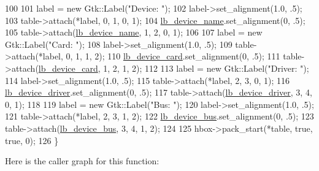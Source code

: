 \begin{DoxyCode}
100 
101         label = \textcolor{keyword}{new} Gtk::Label(\textcolor{stringliteral}{"Device: "});
102         label->set\_alignment(1.0, .5);
103         table->attach(*label, 0, 1, 0, 1);
104         \hyperlink{class_v_s_s_s___g_u_i_1_1_v4_l_interface_a0001884d9b8cfde31da71445c1604c8a}{lb\_device\_name}.set\_alignment(0, .5);
105         table->attach(\hyperlink{class_v_s_s_s___g_u_i_1_1_v4_l_interface_a0001884d9b8cfde31da71445c1604c8a}{lb\_device\_name}, 1, 2, 0, 1);
106 
107         label = \textcolor{keyword}{new} Gtk::Label(\textcolor{stringliteral}{"Card: "});
108         label->set\_alignment(1.0, .5);
109         table->attach(*label, 0, 1, 1, 2);
110         \hyperlink{class_v_s_s_s___g_u_i_1_1_v4_l_interface_add0fb393e547f0ccaa23d6b29025efe4}{lb\_device\_card}.set\_alignment(0, .5);
111         table->attach(\hyperlink{class_v_s_s_s___g_u_i_1_1_v4_l_interface_add0fb393e547f0ccaa23d6b29025efe4}{lb\_device\_card}, 1, 2, 1, 2);
112 
113         label = \textcolor{keyword}{new} Gtk::Label(\textcolor{stringliteral}{"Driver: "});
114         label->set\_alignment(1.0, .5);
115         table->attach(*label, 2, 3, 0, 1);
116         \hyperlink{class_v_s_s_s___g_u_i_1_1_v4_l_interface_a7fe7bf3327c1f25e1c3b44f53e5c5a8f}{lb\_device\_driver}.set\_alignment(0, .5);
117         table->attach(\hyperlink{class_v_s_s_s___g_u_i_1_1_v4_l_interface_a7fe7bf3327c1f25e1c3b44f53e5c5a8f}{lb\_device\_driver}, 3, 4, 0, 1);
118 
119         label = \textcolor{keyword}{new} Gtk::Label(\textcolor{stringliteral}{"Bus: "});
120         label->set\_alignment(1.0, .5);
121         table->attach(*label, 2, 3, 1, 2);
122         \hyperlink{class_v_s_s_s___g_u_i_1_1_v4_l_interface_a14d315a5613f2a10e2534c9090ca74c0}{lb\_device\_bus}.set\_alignment(0, .5);
123         table->attach(\hyperlink{class_v_s_s_s___g_u_i_1_1_v4_l_interface_a14d315a5613f2a10e2534c9090ca74c0}{lb\_device\_bus}, 3, 4, 1, 2);
124 
125         hbox->pack\_start(*table, \textcolor{keyword}{true}, \textcolor{keyword}{true}, 0);
126     \}
\end{DoxyCode}
Here is the caller graph for this function\+:
\mbox{\label{class_v_s_s_s___g_u_i_1_1_v4_l_interface_ae878d432706af05ddc9afe849739327e}} 
